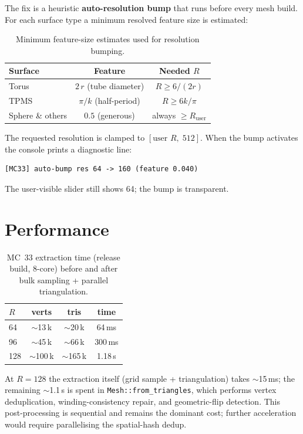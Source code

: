 \documentclass[11pt]{article}
\begin{document}
The fix is a heuristic \textbf{auto-resolution bump} that runs
before every mesh build.  For each surface type a minimum resolved
feature size is estimated:

\begin{table}[h]
\centering
\caption{Minimum feature-size estimates used for resolution bumping.}
\begin{tabular}{lcc}
\toprule
\textbf{Surface} & \textbf{Feature} & \textbf{Needed $R$} \\
\midrule
Torus  & $2\,r$ (tube diameter) & $R \ge 6 / (2r)$ \\
TPMS   & $\pi/k$ (half-period) & $R \ge 6k / \pi$ \\
Sphere \& others & $0.5$ (generous) & always $\ge R_{\text{user}}$ \\
\bottomrule
\end{tabular}
\end{table}

The requested resolution is clamped to $[\text{user }R,\;512]$.
When the bump activates the console prints a diagnostic line:
\begin{lstlisting}
[MC33] auto-bump res 64 -> 160 (feature 0.040)
\end{lstlisting}
The user-visible slider still shows 64; the bump is transparent.

\section{Performance}

\begin{table}[h]
\centering
\caption{MC~33 extraction time (release build, 8-core) before and
after bulk sampling + parallel triangulation.}
\begin{tabular}{lccc}
\toprule
$R$ & verts & tris & time \\
\midrule
64  & $\sim$13\,k  & $\sim$20\,k  & 64\,ms  \\
96  & $\sim$45\,k  & $\sim$66\,k  & 300\,ms \\
128 & $\sim$100\,k & $\sim$165\,k & 1.18\,s \\
\bottomrule
\end{tabular}
\end{table}

At $R{=}128$ the extraction itself (grid sample + triangulation)
takes $\sim$15\,ms; the remaining $\sim$1.1\,s is spent in
\texttt{Mesh::from\_triangles}, which performs vertex deduplication,
winding-consistency repair, and geometric-flip detection.  This
post-processing is sequential and remains the dominant cost; further
acceleration would require parallelising the spatial-hash dedup.
\end{document}
